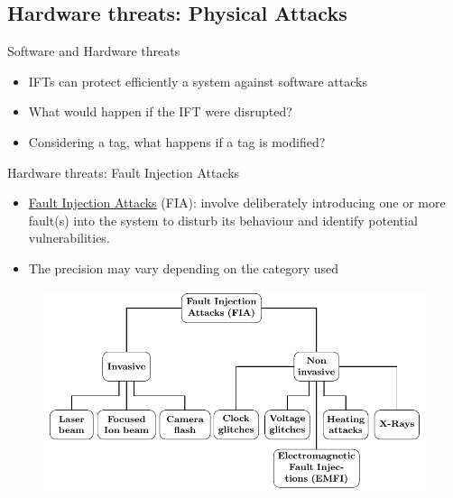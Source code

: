 \subsection{Hardware threats: Physical Attacks}
\begin{frame}{Software and Hardware threats}
    \begin{block}{}
        \begin{itemize}
            [square]
            \justifying
            \item IFTs can protect efficiently a system against software attacks
            \item What would happen if the IFT were disrupted?
            \item Considering a tag, what happens if a tag is modified?
        \end{itemize}
    \end{block}
\end{frame}

\begin{frame}{Hardware threats: Fault Injection Attacks}
    \begin{block}{}
        \begin{itemize}
            [square]
            \justifying
            \item \underline{Fault Injection Attacks} (FIA): involve deliberately introducing one or more fault(s) into the system to disturb its behaviour and identify potential vulnerabilities.
            \item The precision may vary depending on the category used
        \end{itemize}
    \end{block}
    
    \begin{figure}
        \centering
        \includegraphics[height=.5\textheight, page=2]{src/1_introduction/img/physicalAttacks.pdf}
        \label{fig:fia}
    \end{figure}
\end{frame}
